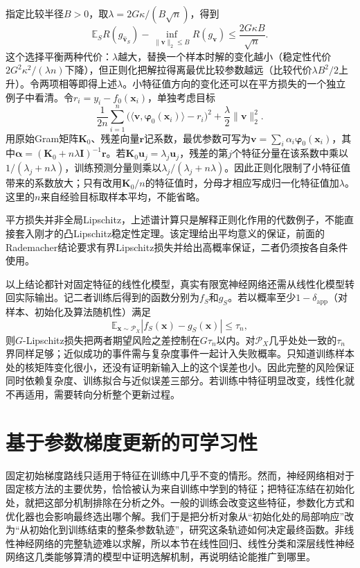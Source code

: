 指定比较半径$B>0$，取$\lambda=2G\kappa/(B\sqrt n)$，得到
\begin{equation}
 \mathbb E_S R(g_{\widehat{\bm v}_S})
 -\inf_{\|\bm v\|_2\leq B}R(g_{\bm v})
 \leq\frac{2G\kappa B}{\sqrt n}.
 \label{eq:ntk-sample-risk}
\end{equation}
这个选择平衡两种代价：$\lambda$越大，替换一个样本时解的变化越小（稳定性代价$2G^2\kappa^2/(\lambda n)$下降），但正则化把解拉得离最优比较参数越远（比较代价$\lambda B^2/2$上升）。令两项相等即得上述$\lambda$。小特征值方向的变化还可以在平方损失的一个独立例子中看清。令$r_i=y_i-f_0(\bm x_i)$，单独考虑目标
\[
 \frac1{2n}\sum_{i=1}^n
 \bigl(\langle\bm v,\bm\varphi_0(\bm x_i)\rangle-r_i\bigr)^2
 +\frac\lambda2\|\bm v\|_2^2.
\]
用原始Gram矩阵$\bm K_0$、残差向量$\bm r$记系数，最优参数可写为$\bm v=\sum_i\alpha_i\bm\varphi_0(\bm x_i)$，其中$\bm\alpha=(\bm K_0+n\lambda\bm I)^{-1}\bm r$。若$\bm K_0\bm u_j=\lambda_j\bm u_j$，残差的第$j$个特征分量在该系数中乘以$1/(\lambda_j+n\lambda)$，训练预测分量则乘以$\lambda_j/(\lambda_j+n\lambda)$。因此正则化限制了小特征值带来的系数放大；只有改用$\bm K_0/n$的特征值时，分母才相应写成归一化特征值加$\lambda$。这里的$n$来自经验目标取样本平均，不能省略。

平方损失并非全局Lipschitz，上述谱计算只是解释正则化作用的代数例子，不能直接套入刚才的凸Lipschitz稳定性定理。该定理给出平均意义的保证，前面的Rademacher结论要求有界Lipschitz损失并给出高概率保证，二者仍须按各自条件使用。

以上结论都针对固定特征的线性化模型，真实有限宽神经网络还需从线性化模型转回实际输出。记二者训练后得到的函数分别为$f_S$和$g_S$。若以概率至少$1-\delta_{\mathrm{app}}$（对样本、初始化及算法随机性）满足
\[
 \mathbb E_{\bm x\sim\mathcal P_X}|f_S(\bm x)-g_S(\bm x)|\leq\tau_n,
\]
则$G$-Lipschitz损失把两者期望风险之差控制在$G\tau_n$以内。对$\mathcal P_X$几乎处处一致的$\tau_n$界同样足够；近似成功的事件需与复杂度事件一起计入失败概率。只知道训练样本处的核矩阵变化很小，还没有证明新输入上的这个误差也小。因此完整的风险保证同时依赖复杂度、训练拟合与近似误差三部分。若训练中特征明显改变，线性化就不再适用，需要转向分析整个更新过程。

\section{基于参数梯度更新的可学习性}
\label{sec:implicit-bias}

固定初始梯度路线只适用于特征在训练中几乎不变的情形。然而，神经网络相对于固定核方法的主要优势，恰恰被认为来自训练中学到的特征；把特征冻结在初始化处，就把这部分机制排除在分析之外。一般的训练会改变这些特征，参数化方式和优化器也会影响最终选出哪个解。我们于是把分析对象从“初始化处的局部响应”改为“从初始化到训练结束的整条参数轨迹”，研究这条轨迹如何决定最终函数。非线性神经网络的完整轨迹难以求解，所以本节在线性回归、线性分类和深层线性神经网络这几类能够算清的模型中证明选解机制，再说明结论能推广到哪里。

